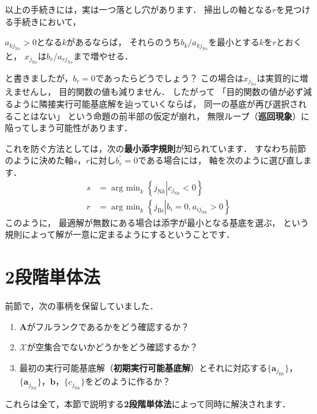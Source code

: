 ﻿\documentclass[a4paper]{jsarticle}
\begin{document}
以上の手続きには，実は一つ落とし穴があります．
掃出しの軸となる$r$を見つける手続きにおいて，
\begin{screen}
$a_{kj_{\mathrm{N}s}}>0$となる$k$があるならば，
それらのうち$b_{k}/a_{kj_{\mathrm{N}s}}$を最小とする$k$を$r$とおくと，
$x_{j_{\mathrm{N}s}}$は$b_{r}/a_{rj_{\mathrm{N}s}}$まで増やせる．
\end{screen}
と書きましたが，$b_{r}=0$であったらどうでしょう？
この場合は$x_{j_{\mathrm{N}s}}$は実質的に増えませんし，
目的関数の値も減りません．
したがって
「目的関数の値が必ず減るように隣接実行可能基底解を辿っていくならば，
同一の基底が再び選択されることはない」
という命題の前半部の仮定が崩れ，
無限ループ（{\bf 巡回現象}）に陥ってしまう可能性があります．

これを防ぐ方法としては，次の{\bf 最小添字規則}が知られています．
すなわち前節のように決めた軸$s$，$r$に対し$b_{r}^{\prime}=0$である場合には，
軸を次のように選び直します．
\begin{align*}
s&=\mathop{\mathrm{arg~min}}_{k}\left\{j_{\mathrm{N}k}\left|c_{j_{\mathrm{N}k}}<0\right.\right\}
\\
r&=\mathop{\mathrm{arg~min}}_{k}\left\{j_{\mathrm{B}i}\left|b_{i}=0, a_{ij_{\mathrm{N}k}}>0\right.\right\}
\end{align*}
このように，
最適解が無数にある場合は添字が最小となる基底を選ぶ，
という規則によって解が一意に定まるようにするということです．



\section{2段階単体法}

前節で，次の事柄を保留していました．
\begin{enumerate}
\item{$\boldsymbol{A}$がフルランクであるかをどう確認するか？}
\item{$\mathcal{X}$が空集合でないかどうかをどう確認するか？}
\item{最初の実行可能基底解（{\bf 初期実行可能基底解}）とそれに対応する$\{\boldsymbol{a}_{j_{\mathrm{B}k}}\}$，$\{\boldsymbol{a}_{j_{\mathrm{N}k}}\}$，$\boldsymbol{b}$，$\{c_{j_{\mathrm{N}k}}\}$をどのように作るか？}
\end{enumerate}
これらは全て，本節で説明する{\bf 2段階単体法}によって同時に解決されます．
\end{document}
